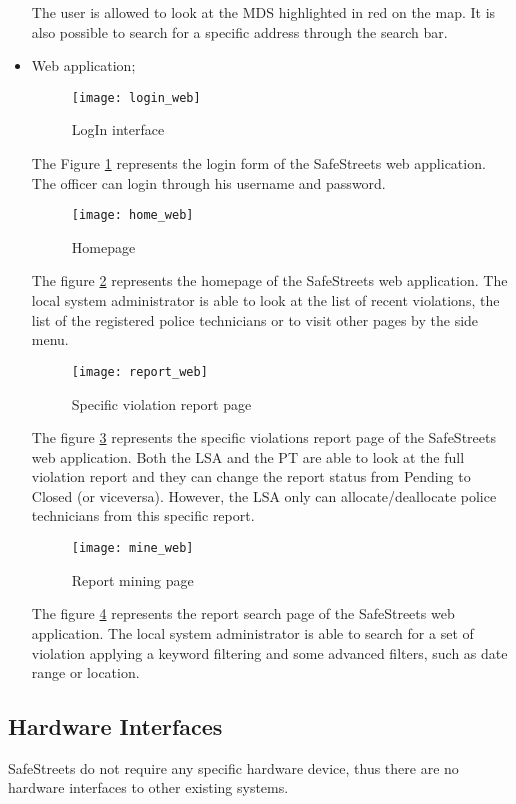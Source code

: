 \begin{itemize}
            The user is allowed to look at the MDS highlighted in red on the map. It is also
            possible to search for a specific address through the search bar.
            \newpage
    \item  Web application;
    \begin{figure}[H]
        \centering
        \texttt{[image: login\_web]}
        \caption{LogIn interface}
        \label{fig:login_web}
    \end{figure}
    The Figure \ref{fig:login_web} represents the login form of the SafeStreets
    web application. The officer can login through his username
    and password.
    \begin{figure}[H]
        \centering
        \texttt{[image: home\_web]}
        \caption{Homepage}
        \label{fig:home_web}
    \end{figure}
    The figure \ref{fig:home_web} represents the homepage of the SafeStreets
    web application. The local system administrator is able to look at the list
    of recent violations, the list of the registered police technicians or to visit
    other pages by the side menu.
    \begin{figure}[H]
        \centering
        \texttt{[image: report\_web]}
        \caption{Specific violation report page}
        \label{fig:report_web}
    \end{figure}
    The figure \ref{fig:report_web} represents the specific violations report
    page of the SafeStreets web application. 
    Both the LSA and the PT are able to look at the full violation report and they can change the report status from Pending to Closed (or viceversa). However, the LSA only can allocate/deallocate police technicians from this specific report.
    \begin{figure}[H]
        \centering
        \texttt{[image: mine\_web]}
        \caption{Report mining page}
        \label{fig:mine_web}
    \end{figure}
    The figure \ref{fig:mine_web} represents the report search page of the SafeStreets web application. 
    The local system administrator is able to search for a set of violation applying a keyword filtering
    and some advanced filters, such as date range or location.
\end{itemize}

\subsection{Hardware Interfaces}
SafeStreets do not require any specific hardware device, 
thus there are no hardware interfaces to other existing systems.
